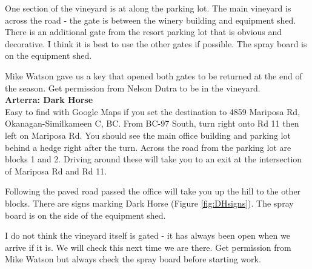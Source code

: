 \documentclass[11pt,letter]{article}
\begin{document}
One section of the vineyard is at along the parking lot. The main vineyard is across the road - the gate is between the winery building and equipment shed. There is an additional gate from the resort parking lot that is obvious and decorative. I think it is best to use the other gates if possible. The spray board is on the equipment shed.

Mike Watson gave us a key that opened both gates to be returned at the end of the season. Get permission from Nelson Dutra to be in the vineyard. \\

{\bf Arterra: Dark Horse} \\
Easy to find with Google Maps if you set the destination to 4859 Mariposa Rd, Okanagan-Similkameen C, BC.
From BC-97 South, turn right onto Rd 11 then left on Mariposa Rd. You should see the main office building and parking lot behind a hedge right after the turn. Across the road from the parking lot are blocks 1 and 2. Driving around these will take you to an exit at the intersection of Mariposa Rd and Rd 11.

Following the paved road passed the office will take you up the hill to the other blocks. There are signs marking Dark Horse (Figure  \ref{fig:DHsigns}). The spray board is on the side of the equipment shed.

I do not think the vineyard itself is gated - it has always been open when we arrive if it is. We will check this next time we are there. Get permission from Mike Watson but always check the spray board before starting work. \\
\end{document}
